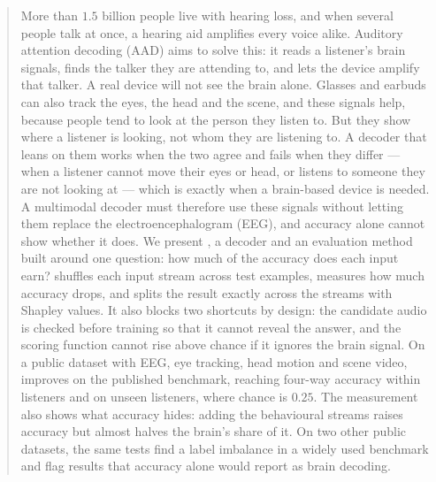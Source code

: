 \begin{abstract}
More than $1.5$ billion people live with hearing loss, and when several people
talk at once, a hearing aid amplifies every voice alike. Auditory attention
decoding (AAD) aims to solve this: it reads a listener's brain signals, finds the
talker they are attending to, and lets the device amplify that talker. A real
device will not see the brain alone. Glasses and earbuds can also track the eyes,
the head and the scene, and these signals help, because people tend to look at
the person they listen to. But they show where a listener is looking, not whom
they are listening to. A decoder that leans on them works when the two agree and
fails when they differ --- when a listener cannot move their eyes or head, or
listens to someone they are not looking at --- which is exactly when a brain-based
device is needed. A multimodal decoder must therefore use these signals without
letting them replace the electroencephalogram (EEG), and accuracy alone cannot
show whether it does. We
present \merit{}, a decoder and an evaluation method built around one question:
how much of the accuracy does each input earn? \merit{} shuffles each input
stream across test examples, measures how much accuracy drops, and splits the
result exactly across the streams with Shapley values. It also blocks two
shortcuts by design: the candidate audio is checked before training so that it
cannot reveal the answer, and the scoring function cannot rise above chance if it
ignores the brain signal. On a public dataset with EEG, eye tracking, head motion
and scene video, \merit{} improves on the published benchmark, reaching
 four-way accuracy within listeners and
 on unseen listeners, where chance is
$0.25$. The measurement also shows what accuracy hides: adding the behavioural
streams raises accuracy but almost halves the brain's share of it. On two other
public datasets, the same tests find a label imbalance in a widely used benchmark
and flag results that accuracy alone would report as brain decoding.
\end{abstract}
